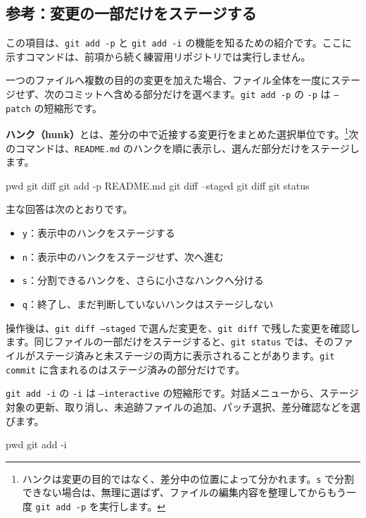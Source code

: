 \documentclass[a4paper,11pt]{jlreq}
\newcommand{\cmd}[1]{\texttt{#1}}
\newcommand{\term}[1]{\textbf{#1}}
\begin{document}
\subsection{参考：変更の一部だけをステージする}
\enlargethispage{4pt}

この項目は、\cmd{git add -p} と \cmd{git add -i} の機能を知るための紹介です。ここに示すコマンドは、前項から続く練習用リポジトリでは実行しません。

一つのファイルへ複数の目的の変更を加えた場合、ファイル全体を一度にステージせず、次のコミットへ含める部分だけを選べます。\cmd{git add -p} の \cmd{-p} は \cmd{--patch} の短縮形です。

\term{ハンク（hunk）}とは、差分の中で近接する変更行をまとめた選択単位です。\footnote{ハンクは変更の目的ではなく、差分中の位置によって分かれます。\cmd{s} で分割できない場合は、無理に選ばず、ファイルの編集内容を整理してからもう一度 \cmd{git add -p} を実行します。}次のコマンドは、\cmd{README.md} のハンクを順に表示し、選んだ部分だけをステージします。

\begin{codeblock}
pwd
git diff
git add -p README.md
git diff --staged
git diff
git status
\end{codeblock}

主な回答は次のとおりです。

\begin{itemize}
  \item \cmd{y}：表示中のハンクをステージする
  \item \cmd{n}：表示中のハンクをステージせず、次へ進む
  \item \cmd{s}：分割できるハンクを、さらに小さなハンクへ分ける
  \item \cmd{q}：終了し、まだ判断していないハンクはステージしない
\end{itemize}

操作後は、\cmd{git diff --staged} で選んだ変更を、\cmd{git diff} で残した変更を確認します。同じファイルの一部だけをステージすると、\cmd{git status} では、そのファイルがステージ済みと未ステージの両方に表示されることがあります。\cmd{git commit} に含まれるのはステージ済みの部分だけです。

\cmd{git add -i} の \cmd{-i} は \cmd{--interactive} の短縮形です。対話メニューから、ステージ対象の更新、取り消し、未追跡ファイルの追加、パッチ選択、差分確認などを選びます。

\begin{codeblock}
pwd
git add -i
\end{codeblock}
\end{document}
